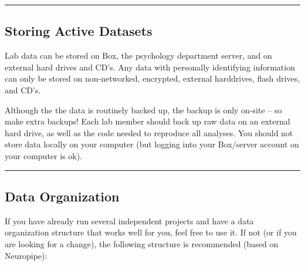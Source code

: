 \documentclass[]{book}
\begin{document}
\begin{center}\rule{0.5\linewidth}{0.5pt}\end{center}

\hypertarget{storing-active-datasets}{%
\subsection{Storing Active Datasets}\label{storing-active-datasets}}

Lab data can be stored on Box, the psychology department server, and on external hard drives and CD's. Any data with personally identifying information can only be stored on non-networked, encrypted, external harddrives, flash drives, and CD's.

Although the the data is routinely backed up, the backup is only on-site -- so make extra backups! Each lab member should back up raw data on an external hard drive, as well as the code needed to reproduce all analyses. You should not store data locally on your computer (but logging into your Box/server account on your computer is ok).

\begin{center}\rule{0.5\linewidth}{0.5pt}\end{center}

\hypertarget{data-organization}{%
\subsection{Data Organization}\label{data-organization}}

If you have already run several independent projects and have a data organization structure that works well for you, feel free to use it. If not (or if you are looking for a change), the following structure is recommended (based on Neuropipe):
\end{document}
